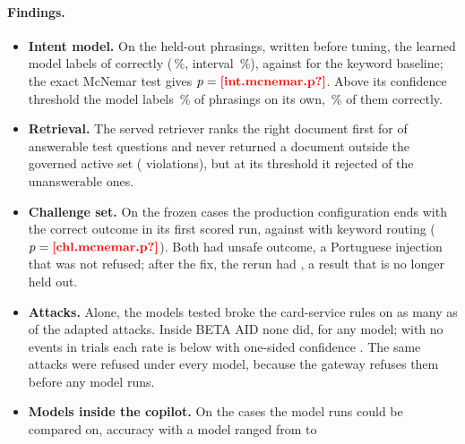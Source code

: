 \paragraph{Findings.}
\begin{itemize}[leftmargin=*]
  \item \textbf{Intent model.} On the held-out phrasings, written before tuning, the learned model labels
   of  correctly (\,\%, interval
  \,\%), against  for the keyword baseline; the exact McNemar
  test gives $p = \est{int.mcnemar}{p}$. Above its confidence threshold the model labels
  \,\% of phrasings on its own, \,\% of them correctly.
  \item \textbf{Retrieval.} The served retriever ranks the right document first for  of
   answerable test questions and never returned a document outside the governed active
  set ( violations), but at its threshold it rejected
   of the  unanswerable ones.
  \item \textbf{Challenge set.} On the  frozen cases the production configuration ends
   with the correct outcome in its first scored run, against
   with keyword routing ($p = \est{chl.mcnemar}{p}$). Both had
   unsafe outcome, a Portuguese injection that was not refused; after the fix, the
  rerun had , a result that is no longer held out.
  \item \textbf{Attacks.} Alone, the  models tested broke the card-service rules on as many as
   of the  adapted attacks. Inside BETA AID none did, for any
  model; with no events in  trials each rate is below 
  with one-sided confidence . The same  attacks were refused under every
  model, because the gateway refuses them before any model runs.
  \item \textbf{Models inside the copilot.} On the  cases the model runs could be
  compared on, accuracy with a model ranged from  to

\end{itemize}
